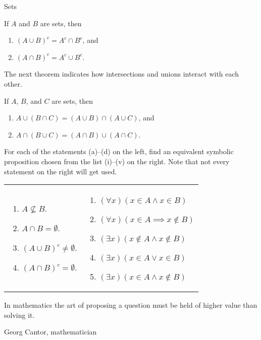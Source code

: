 \begin{section}{Sets}
\begin{theorem}
If $A$ and $B$ are sets, then
\begin{enumerate}[label=\textrm{(\alph*)}]
\item $(A \cup B)^c = A^c \cap B^c$, and
\item $(A \cap B)^c = A^c \cup B^c$.
\end{enumerate}
\end{theorem}

The next theorem indicates how intersections and unions interact with each other.

\begin{theorem}
If $A$, $B$, and $C$ are sets, then
\begin{enumerate}[label=\textrm{(\alph*)}]
\item $A \cup(B\cap C) = (A\cup B)\cap (A\cup C)$, and
\item $A\cap (B\cup C)= (A\cap B)\cup (A\cap C)$.
\end{enumerate}
\end{theorem}

\begin{problem}
For each of the statements (a)--(d) on the left, find an equivalent symbolic proposition chosen from the list (i)--(v) on the right.  Note that not every statement on the right will get used.

\begin{tabular}{@{}ll}
\begin{minipage}[l]{3.25in}
\begin{enumerate}[label=\textrm{(\alph*)}]
\item $A \nsubseteq B$. 
\item $A \cap B= \emptyset$. 
\item $(A \cup B)^{c} \neq \emptyset$. 
\item $(A \cap B)^{c} = \emptyset$.
\end{enumerate}
\end{minipage}
 &
\begin{minipage}[l]{3.25in}
\begin{enumerate}[label=\textrm{(\roman*)}]
\item $(\forall x)(x \in A \wedge x \in B)$ 
\item $(\forall x)(x \in A \implies x \notin B)$ 
\item $(\exists x)(x \notin A \wedge x \notin B)$
\item $(\exists x)(x \in A \vee x \in B)$
\item $(\exists x)(x \in A \wedge x\notin B)$
\end{enumerate}
\end{minipage}
\end{tabular}
\end{problem}

\epigraph{In mathematics the art of proposing a question must be held of higher value than solving it.}{Georg Cantor, mathematician}

\end{section}
